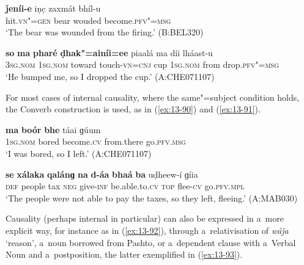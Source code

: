 \ex
\label{ex:13-88}
\gll \textbf{ǰeníi-e} iṇc̣ zaxmát bhíl-u \\
hit.\textsc{vn"=gen} bear wouded become.\textsc{pfv"=msg} \\
\glt `The bear was wounded from the firing.' (B:BEL320)

\ex
\label{ex:13-89}
\gll \textbf{so} \textbf{ma} \textbf{pharé} \textbf{ḍhak"=ainíi=ee} piaalá ma díi lháast-u\\
\textsc{3sg.nom} \textsc{1sg.nom} toward touch-\textsc{vn=cnj} cup \textsc{1sg.nom} from drop.\textsc{pfv"=msg}\\
\glt `He bumped me, so I dropped the cup.' (A:CHE071107) 
\z

For most cases of internal causality, where the same"=subject condition holds, the Converb construction is used, as in (\ref{ex:13-90}) and (\ref{ex:13-91}).

\begin{exe}
\ex
\label{ex:13-90}
\gll \textbf{ma} \textbf{boór} \textbf{bhe} táai ɡúum  \\
\textsc{1sg.nom} bored become.\textsc{cv} from.there go.\textsc{pfv.msg}  \\
\glt `I was bored, so I left.' (A:CHE071107)

\ex
\label{ex:13-91}
\gll \textbf{se} \textbf{xálaka} \textbf{qalánɡ} \textbf{na} \textbf{d-áa} \textbf{bhaá} \textbf{ba} uḍheew-í ɡíia \\
 \textsc{def} people tax \textsc{neg} give-\textsc{inf} be.able.to.\textsc{cv} \textsc{top} flee-\textsc{cv}  go.\textsc{pfv.mpl}   \\
\glt `The people were not able to pay the taxes, so they left, fleeing.' (A:MAB030) 
\end{exe}

Causality (perhaps internal in particular) can also be expressed in a~more explicit way, for instance as in (\ref{ex:13-92}), through a~relativisation of \textit{wáǰa} `reason', a~noun borrowed from Pashto, or a~dependent clause with a~Verbal Noun and a~postposition, the latter exemplified in (\ref{ex:13-93}).

